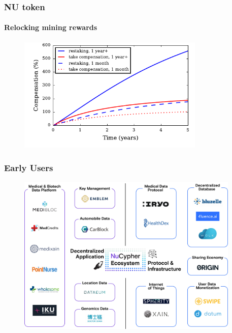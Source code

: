 \documentclass[xetex,mathsans,sans,aspectratio=169]{beamer}
\begin{document}
    \begin{frame}
        \frametitle{NU token}
        \framesubtitle{Relocking mining rewards}
        \begin{figure}
            \centering
            \includegraphics[height=5.5cm]{pdf/total-compensation.pdf}
        \end{figure}
    \end{frame}

    \begin{frame}
      \frametitle{Early Users}
      \begin{figure}
           \includegraphics[width=10.6cm]{pdf/projects.pdf}
      \end{figure}
    \end{frame}
\end{document}

